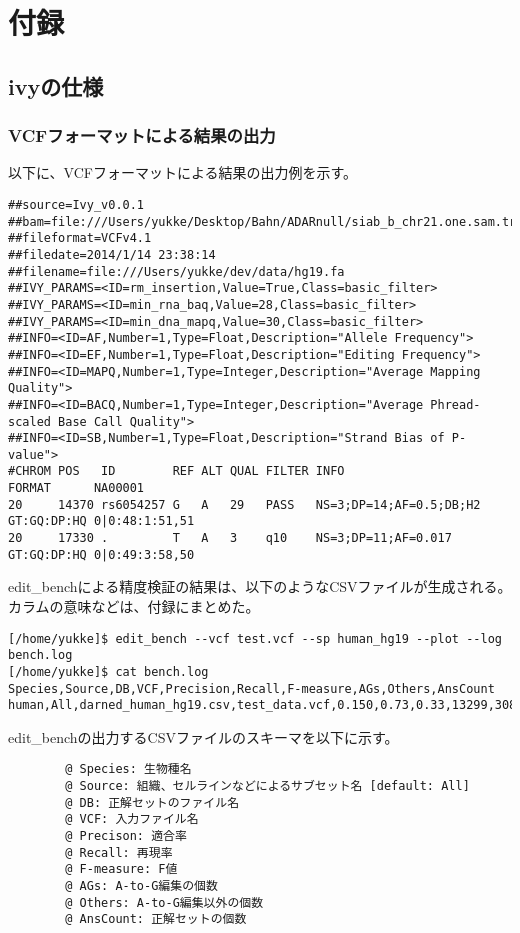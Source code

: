 \chapter*{付録}
\section*{ivyの仕様}
\subsection*{VCFフォーマットによる結果の出力}

以下に、VCFフォーマットによる結果の出力例を示す。

\scriptsize
\begin{verbatim}
##source=Ivy_v0.0.1
##bam=file:///Users/yukke/Desktop/Bahn/ADARnull/siab_b_chr21.one.sam.true.sorted.bam
##fileformat=VCFv4.1
##filedate=2014/1/14 23:38:14
##filename=file:///Users/yukke/dev/data/hg19.fa
##IVY_PARAMS=<ID=rm_insertion,Value=True,Class=basic_filter>
##IVY_PARAMS=<ID=min_rna_baq,Value=28,Class=basic_filter>
##IVY_PARAMS=<ID=min_dna_mapq,Value=30,Class=basic_filter>
##INFO=<ID=AF,Number=1,Type=Float,Description="Allele Frequency">
##INFO=<ID=EF,Number=1,Type=Float,Description="Editing Frequency">
##INFO=<ID=MAPQ,Number=1,Type=Integer,Description="Average Mapping Quality">
##INFO=<ID=BACQ,Number=1,Type=Integer,Description="Average Phread-scaled Base Call Quality">
##INFO=<ID=SB,Number=1,Type=Float,Description="Strand Bias of P-value">
#CHROM POS   ID        REF ALT QUAL FILTER INFO                    FORMAT      NA00001        
20     14370 rs6054257 G   A   29   PASS   NS=3;DP=14;AF=0.5;DB;H2 GT:GQ:DP:HQ 0|0:48:1:51,51 
20     17330 .         T   A   3    q10    NS=3;DP=11;AF=0.017     GT:GQ:DP:HQ 0|0:49:3:58,50 
\end{verbatim}
\normalsize


edit\_benchによる精度検証の結果は、以下のようなCSVファイルが生成される。カラムの意味などは、付録にまとめた。

\scriptsize
\begin{verbatim}
[/home/yukke]$ edit_bench --vcf test.vcf --sp human_hg19 --plot --log bench.log
[/home/yukke]$ cat bench.log
Species,Source,DB,VCF,Precision,Recall,F-measure,AGs,Others,AnsCount
human,All,darned_human_hg19.csv,test_data.vcf,0.150,0.73,0.33,13299,308744
\end{verbatim}
\normalsize

edit\_benchの出力するCSVファイルのスキーマを以下に示す。
\begin{easylist}[itemize]
\scriptsize
	\begin{verbatim}
		@ Species: 生物種名
		@ Source: 組織、セルラインなどによるサブセット名 [default: All]
		@ DB: 正解セットのファイル名
		@ VCF: 入力ファイル名
		@ Precison: 適合率
		@ Recall: 再現率
		@ F-measure: F値
		@ AGs: A-to-G編集の個数
		@ Others: A-to-G編集以外の個数
		@ AnsCount: 正解セットの個数
	\end{verbatim}
\end{easylist}
\normalsize

